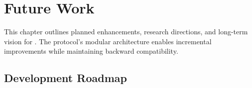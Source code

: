 \chapter{Future Work}
\label{ch:future-work}

This chapter outlines planned enhancements, research directions, and long-term vision for \tprotocol{}. The protocol's modular architecture enables incremental improvements while maintaining backward compatibility.

\section{Development Roadmap}
\label{sec:roadmap}

